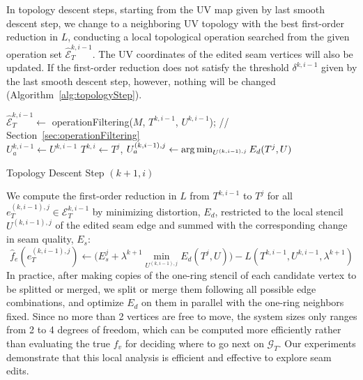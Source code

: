 In topology descent steps, starting from the UV map given by last smooth descent step, we change to a neighboring UV topology with the best first-order reduction in $L$, conducting a local topological operation searched from the given operation set $\hat{\mathcal{E}}^{k,i-1}_T$. The UV coordinates of the edited seam vertices will also be updated. If the first-order reduction does not satisfy the threshold $\delta^{k,i-1}$ given by the last smooth descent step, however, nothing will be changed (Algorithm~\ref{alg:topologyStep}).

\begin{algorithm}[h]
\SetAlgoLined
{}
$\hat{\mathcal{E}}^{k,i-1}_T \leftarrow$ operationFiltering($M$, $T^{k,i-1}$, $U^{k,i-1}$); // Section~\ref{sec:operationFiltering}\\
$U_a^{k,i-1} \leftarrow U^{k,i-1}$\;
{
  $T^{k,i} \leftarrow T^j$, $U_a^{(k,i-1),j} \leftarrow \operatorname*{arg\,min}_{U^{(k,i-1),j}} E_d(T^j,U)$\;
}
\caption{Topology Descent Step $(k+1,i)$}
\label{alg:topologyStep}
\end{algorithm}
 
We compute the first-order reduction in $L$ from $T^{k,i-1}$ to $T^j$ for all $e^{(k,i-1),j}_T \in \mathcal{E}^{k,i-1}_T$ by minimizing distortion, $E_d$, restricted to the local stencil $U^{(k,i-1),j}$ of the edited seam edge and summed with the corresponding change in seam quality, $E_s$:
\[\hat{f}_e(e^{(k,i-1),j}_{T}) \leftarrow \Big(E^j_s + \lambda^{k+1} \min_{U^{(k,i-1),j}} E_d(T^j,U)\Big) - L(T^{k,i-1},U^{k,i-1},\lambda^{k+1})\]
In practice, after making copies of the one-ring stencil of each candidate vertex to be splitted or merged, we split or merge them following all possible edge combinations, and optimize $E_d$ on them in parallel with the one-ring neighbors fixed. Since no more than 2 vertices are free to move, the system sizes only ranges from 2 to 4 degrees of freedom, which can be computed more efficiently rather than evaluating the true $f_v$ for deciding where to go next on $\mathcal{G}_T$. Our experiments demonstrate that this local analysis is efficient and effective to explore seam edits.


